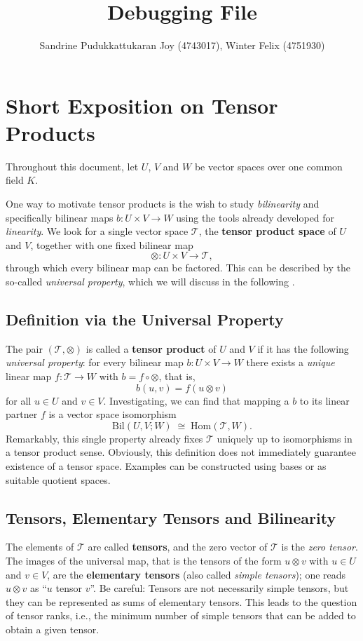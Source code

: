\documentclass{article}
\title{Debugging File}
\author{Sandrine Pudukkattukaran Joy (4743017), Winter Felix (4751930)}
\begin{document}
\maketitle

\section{Short Exposition on Tensor Products}\label{sec:tensors}
Throughout this document, let $U$, $V$ and $W$ be vector spaces over one common field $K$.

One way to motivate tensor products is the wish to study \emph{bilinearity} and specifically bilinear maps $b \colon U \times V \to W$ using the tools already developed for \emph{linearity}.
We look for a single vector space $\mathcal{T}$, the \textbf{tensor product space} of $U$ and $V$, together with one fixed bilinear map
\[
	\otimes \colon U \times V \to \mathcal{T},
\]
through which every bilinear map can be factored.
This can be described by the so-called \emph{universal property}, which we will discuss in the following .

\subsection{Definition via the Universal Property}\label{subsec:universal}
The pair $(\mathcal{T}, \otimes)$ is called a \textbf{tensor product} of $U$ and $V$ if it has the following \emph{universal property}: for every bilinear map $b \colon U \times V \to W$ there exists a \emph{unique} linear map $f \colon \mathcal{T} \to W$ with $b = f \circ \otimes$, that is,
\[
	b(u,v) = f(u \otimes v)
\]
for all $u \in U$ and $v \in V$.
Investigating, we can find that mapping a $b$ to its linear partner $f$ is a vector space isomorphism
\[
	\mathrm{Bil}(U,V;W) \; \cong \; \mathrm{Hom}(\mathcal{T}, W).
\]
Remarkably, this single property already fixes $\mathcal{T}$ uniquely up to isomorphisms in a tensor product sense.
Obviously, this definition does not immediately guarantee existence of a tensor space.
Examples can be constructed using bases or as suitable quotient spaces.

\subsection{Tensors, Elementary Tensors and Bilinearity}\label{subsec:tensors}
The elements of $\mathcal{T}$ are called \textbf{tensors}, and the zero vector of $\mathcal{T}$ is the \emph{zero tensor}.
The images of the universal map, that is the tensors of the form $u \otimes v$ with $u \in U$ and $v \in V$, are the \textbf{elementary tensors} (also called \emph{simple tensors}); one reads $u \otimes v$ as ``$u$ tensor $v$''.
Be careful: Tensors are not necessarily simple tensors, but they can be represented as sums of elementary tensors.
This leads to the question of tensor ranks, i.e., the minimum number of simple tensors that can be added to obtain a given tensor.
\end{document}
